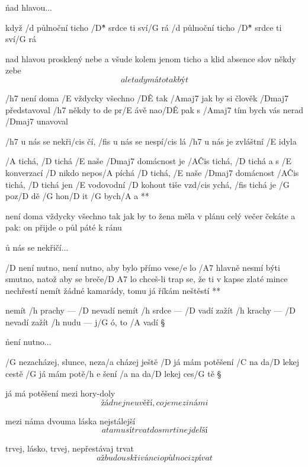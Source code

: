 \r nad hlavou...

když /d půlnoční ticho /D\^{*} srdce ti sví/G rá
/d půlnoční ticho /D\^{*} srdce ti sví/G rá

\rr

nad hlavou prosklený nebe
a všude kolem jenom ticho a klid
absence slov někdy zebe
\[ ale tady má to tak být \]




/h7 není doma /E vždycky všechno /D\^E tak
/Amaj7 jak by si člověk /Dmaj7 představoval
/h7 někdy to de pr/E ávě nao/D\^E pak
s /Amaj7 tím bych vás nerad /Dmaj7 unavoval

\R  /h7 u nás se nekři/cis čí, /fis u nás se nespí/cis lá
    /h7 u nás je zvláštní /E idyla

    /A tichá, /D tichá /E naše /Dmaj7 domácnost je /A\^{Cis} tichá, /D tichá
    a s /E konverzací /D nikdo nepos/A píchá
    /D tichá, /E naše /Dmaj7 domácnost /A\^{Cis} tichá, /D tichá
    jen /E vodovodní /D kohout tiše vzd/cis ychá, /fis tichá
    je /G poz/D dě /G hon/D it /G bych/A a **

není doma vždycky všechno tak
jak by to žena měla v plánu
celý večer čekáte a pak:
on přijde o půl páté k ránu

\r u nás se nekřičí...




\R  /D není nutno, není nutno, aby bylo přímo vese/e lo
    /A7 hlavně nesmí býti smutno, natož aby se breče/{D A7} lo \s
    chceš-li trap se, že ti v kapse zlaté mince nechřestí
    nemít žádné kamarády, tomu já říkám neštěstí **

nemít /h prachy --- /D nevadí
nemít /h srdce --- /D vadí
zažít /h krachy --- /D nevadí
zažít /h nudu --- j/G ó, to /A vadí \S

\r není nutno...




/G nezacházej, slunce, neza/a cházej ještě
/D já mám potěšení /C na da/D lekej cestě
/G já mám potě/{h e} šení    /a na da/D lekej ces/G tě \S

já má potěšení mezi hory-doly
\[ žádnej neuvěří, co je mezi námi \] \s

mezi náma dvouma láska nejstálejší
\[ a ta musí trvat do smrti nejdelší \] \s

trvej, lásko, trvej, nepřestávaj trvat
\[ až budou skřivánci o půlnoci zpívat \] \s


